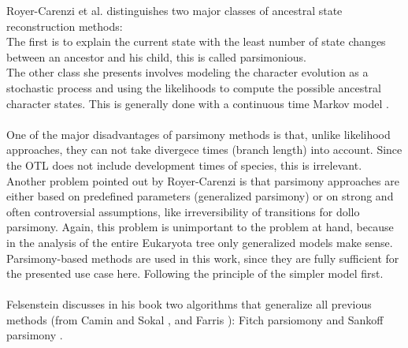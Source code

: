   
    Royer-Carenzi et al. distinguishes two major classes of ancestral state reconstruction methods: \\
    The first is to explain the current state with the least number of state changes between an 
      ancestor and his child, this is called parsimonious. \\
    The other class she presents involves modeling the character evolution as a stochastic process and 
      using the likelihoods to compute the possible ancestral character states. This is generally done 
      with a continuous time Markov model \cite{RoyerCarenzi2013}. \\
     \\

    One of the major disadvantages of parsimony methods is that, unlike likelihood approaches, they 
      can not take divergece times (branch length) into account. Since the OTL does not include 
      development times of species, this is irrelevant. \\
    Another problem pointed out by Royer-Carenzi is that parsimony approaches are either based on 
      predefined parameters (generalized parsimony) or on strong and often controversial assumptions, 
      like irreversibility of transitions for dollo parsimony. Again, this problem is unimportant to 
      the problem at hand, because in the analysis of the entire Eukaryota tree only generalized 
      models make sense. \\

    Parsimony-based methods are used in this work, since they are fully sufficient for the presented 
      use case here. Following the principle of the simpler model first. \\
     \\
    Felsenstein \cite{Felsenstein2003} discusses in his book two algorithms that generalize all 
      previous methods (from Camin and Sokal \cite{Camin1965},  and Farris 
      \cite{Farris1970}): Fitch parsiomony \cite{Fitch1971} and Sankoff parsimony \cite{Sankoff1975}. \\
     \\
     \\
    
